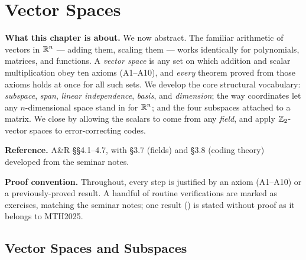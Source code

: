 \chapter{Vector Spaces}
\label{ch:vector-spaces}

\begin{roadmap}
\noindent\textbf{What this chapter is about.}\;
We now abstract. The familiar arithmetic of vectors in $\mathbb{R}^n$ --- adding them, scaling them --- works identically for polynomials, matrices, and functions. A \emph{vector space} is any set on which addition and scalar multiplication obey ten axioms (A1--A10), and \emph{every} theorem proved from those axioms holds at once for all such sets. We develop the core structural vocabulary: \emph{subspace}, \emph{span}, \emph{linear independence}, \emph{basis}, and \emph{dimension}; the way coordinates let any $n$-dimensional space stand in for $\mathbb{R}^n$; and the four subspaces attached to a matrix. We close by allowing the scalars to come from any \emph{field}, and apply $\mathbb{Z}_2$-vector spaces to error-correcting codes.
\medskip

\noindent\textbf{Reference.}\; A\&R \S\S4.1--4.7, with \S3.7 (fields) and \S3.8 (coding theory) developed from the seminar notes.

\noindent\textbf{Proof convention.}\; Throughout, every step is justified by an axiom (A1--A10) or a previously-proved result. A handful of routine verifications are marked as exercises, matching the seminar notes; one result () is stated without proof as it belongs to MTH2025.
\end{roadmap}

\section{Vector Spaces and Subspaces}
\label{sec:3.1}

